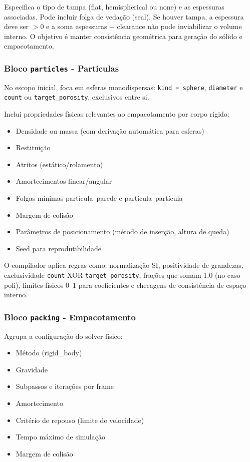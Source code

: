 Especifica o tipo de tampa (flat, hemispherical ou none) e as espessuras associadas. Pode incluir folga de vedação (seal). Se houver tampa, a espessura deve ser $> 0$ e a soma espessuras + clearance não pode inviabilizar o volume interno. O objetivo é manter consistência geométrica para geração do sólido e empacotamento.

\subsubsection{Bloco \texttt{particles} - Partículas}

No escopo inicial, foca em esferas monodispersas: \texttt{kind = sphere}, \texttt{diameter} e \texttt{count} ou \texttt{target\_porosity}, exclusivos entre si. 

Inclui propriedades físicas relevantes ao empacotamento por corpo rígido:
\begin{itemize}
    \item Densidade ou massa (com derivação automática para esferas)
    \item Restituição
    \item Atritos (estático/rolamento)
    \item Amortecimentos linear/angular
    \item Folgas mínimas partícula–parede e partícula–partícula
    \item Margem de colisão
    \item Parâmetros de posicionamento (método de inserção, altura de queda)
    \item Seed para reprodutibilidade
\end{itemize}

O compilador aplica regras como: normalização SI, positividade de grandezas, exclusividade \texttt{count} XOR \texttt{target\_porosity}, frações que somam 1.0 (no caso poli), limites físicos 0–1 para coeficientes e checagens de consistência de espaço interno.

\subsubsection{Bloco \texttt{packing} - Empacotamento}

Agrupa a configuração do solver físico:
\begin{itemize}
    \item Método (rigid\_body)
    \item Gravidade
    \item Subpassos e iterações por frame
    \item Amortecimento
    \item Critério de repouso (limite de velocidade)
    \item Tempo máximo de simulação
    \item Margem de colisão
\end{itemize}

